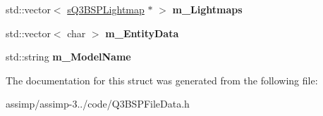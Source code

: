 \begin{DoxyCompactItemize}
\item 
\hypertarget{struct_assimp_1_1_q3_b_s_p_1_1_q3_b_s_p_model_a354267f6184ccf316b802ea8a68fb192}{std\+::vector$<$ \hyperlink{struct_assimp_1_1_q3_b_s_p_1_1s_q3_b_s_p_lightmap}{s\+Q3\+B\+S\+P\+Lightmap} $\ast$ $>$ {\bfseries m\+\_\+\+Lightmaps}}\label{struct_assimp_1_1_q3_b_s_p_1_1_q3_b_s_p_model_a354267f6184ccf316b802ea8a68fb192}

\item 
\hypertarget{struct_assimp_1_1_q3_b_s_p_1_1_q3_b_s_p_model_a488597c50f3e7c5b6a48848b3971a82b}{std\+::vector$<$ char $>$ {\bfseries m\+\_\+\+Entity\+Data}}\label{struct_assimp_1_1_q3_b_s_p_1_1_q3_b_s_p_model_a488597c50f3e7c5b6a48848b3971a82b}

\item 
\hypertarget{struct_assimp_1_1_q3_b_s_p_1_1_q3_b_s_p_model_a45ecebd33f5d0ff1ffe805ba58967f79}{std\+::string {\bfseries m\+\_\+\+Model\+Name}}\label{struct_assimp_1_1_q3_b_s_p_1_1_q3_b_s_p_model_a45ecebd33f5d0ff1ffe805ba58967f79}

\end{DoxyCompactItemize}


The documentation for this struct was generated from the following file\+:\begin{DoxyCompactItemize}
\item 
assimp/assimp-\/3../code/Q3\+B\+S\+P\+File\+Data.\+h\end{DoxyCompactItemize}
